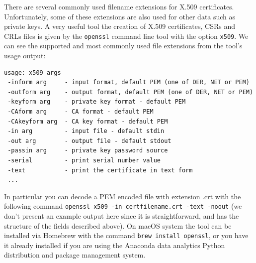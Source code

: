 \documentclass[11pt]{article}
\begin{document}
There are several commonly used filename extensions for X.509 certificates. Unfortunately, some of these extensions are also used for other data such as private keys. A very useful tool the creation of X.509 certificates, CSRs and CRLs files is given by the \texttt{openssl} command line tool with the option \texttt{x509}. We can see the supported and most commonly used file extensions from the tool's usage output:
\begin{verbatim}
usage: x509 args
 -inform arg     - input format, default PEM (one of DER, NET or PEM)
 -outform arg    - output format, default PEM (one of DER, NET or PEM)
 -keyform arg    - private key format - default PEM
 -CAform arg     - CA format - default PEM
 -CAkeyform arg  - CA key format - default PEM
 -in arg         - input file - default stdin
 -out arg        - output file - default stdout
 -passin arg     - private key password source
 -serial         - print serial number value
 -text           - print the certificate in text form
 ...
\end{verbatim}
In particular you can decode a PEM encoded file with extension .crt with the following command \texttt{openssl x509 -in certfilename.crt -text -noout} (we don't present an example output here since it is straightforward, and has the structure of the fields described above). On macOS system the tool can be installed via Homebrew with the command \texttt{brew install openssl}, or you have it already installed if you are using the Anaconda data analytics Python distribution and package management system.
\end{document}

